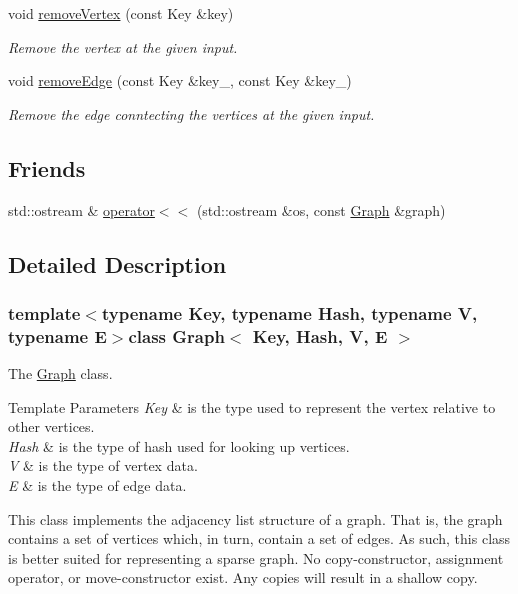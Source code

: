 \begin{DoxyCompactItemize}
void \hyperlink{class_graph_ac05cba56c39d45e3d87d340da5c9f961}{remove\+Vertex} (const Key \&key)
\begin{DoxyCompactList}\small\item\em Remove the vertex at the given input. \end{DoxyCompactList}\item 
void \hyperlink{class_graph_a8e084b3d3126f70deede7e4386946c33}{remove\+Edge} (const Key \&key\+\_, const Key \&key\+\_)
\begin{DoxyCompactList}\small\item\em Remove the edge conntecting the vertices at the given input. \end{DoxyCompactList}\end{DoxyCompactItemize}
\subsection*{Friends}
\begin{DoxyCompactItemize}
\item 
std\+::ostream \& \hyperlink{class_graph_a5355de1f523ad1574638b997e6ecdeee}{operator$<$$<$} (std\+::ostream \&os, const \hyperlink{class_graph}{Graph} \&graph)
\end{DoxyCompactItemize}


\subsection{Detailed Description}
\subsubsection*{template$<$typename Key, typename Hash, typename V, typename E$>$class Graph$<$ Key, Hash, V, E $>$}

The \hyperlink{class_graph}{Graph} class. 


\begin{DoxyTemplParams}{Template Parameters}
{\em Key} & is the type used to represent the vertex relative to other vertices. \\
\hline
{\em Hash} & is the type of hash used for looking up vertices. \\
\hline
{\em V} & is the type of vertex data. \\
\hline
{\em E} & is the type of edge data.\\
\hline
\end{DoxyTemplParams}
This class implements the adjacency list structure of a graph. That is, the graph contains a set of vertices which, in turn, contain a set of edges. As such, this class is better suited for representing a sparse graph. No copy-\/constructor, assignment operator, or move-\/constructor exist. Any copies will result in a shallow copy. 

